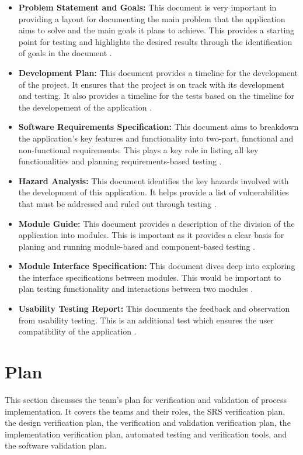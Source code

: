 \documentclass[12pt, titlepage]{article}
\begin{document}
\begin{itemize}
    \item \textbf{Problem Statement and Goals:} This document is very important in providing a layout for documenting the main problem that the application aims to solve and the main goals it plans to achieve. This provides a starting point for testing and highlights the desired results through the identification of goals in the document \citet{PSG}. 
    \item \textbf{Development Plan:} This document provides a timeline for the development of the project. It ensures that the project is on track with its development and testing. It also provides a timeline for the tests based on the timeline for the developement of the application \citet{DevPlan}. 
    \item \textbf{Software Requirements Specification:}  This document aims to breakdown the application's key features and functionality into two-part, functional and non-functional requirements. This plays a key role in listing all key functionalities and planning requirements-based testing \citet{SRS}. 
    \item \textbf{Hazard Analysis:} This document identifies the key hazards involved with the development of this application. It helps provide a list of vulnerabilities that must be addressed and ruled out through testing \citet{HA}. 
    \item \textbf{Module Guide:} This document provides a description of the division of the application into modules. This is important as it provides a clear basis for planing and running module-based and component-based testing \citet{MG}. 
    \item \textbf{Module Interface Specification:} This document dives deep into exploring the interface specifications between modules. This would be important to plan testing functionality and interactions between two modules \citet{MIS}. 
    \item \textbf{Usability Testing Report:} This documents the feedback and observation from usability testing. This is an additional test which ensures the user compatibility of the application \citet{UT}. 
\end{itemize}

\section{Plan}

This section discusses the team's plan for verification and validation of process implementation. It covers the teams and their roles, the SRS verification plan, the design verification plan, the verification and validation verification plan, the implementation verification plan, automated testing and verification tools, and the software validation plan. 
\end{document}
